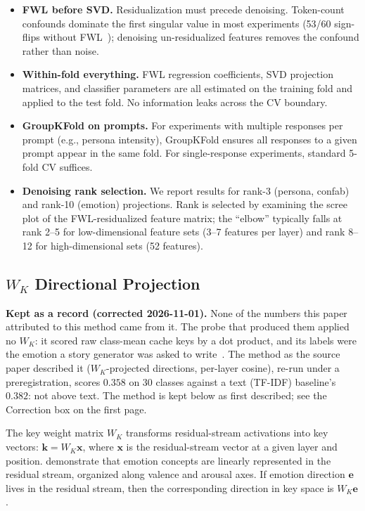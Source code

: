 \documentclass[11pt,a4paper]{article}
\begin{document}
\begin{itemize}[nosep]
    \item \textbf{FWL before SVD.} Residualization must precede denoising.
    Token-count confounds dominate the first singular value in most experiments
    (53/60 sign-flips without FWL~\citep{lyra_spectral}); denoising
    un-residualized features removes the confound rather than noise.

    \item \textbf{Within-fold everything.} FWL regression coefficients, SVD
    projection matrices, and classifier parameters are all estimated on the
    training fold and applied to the test fold. No information leaks across
    the CV boundary.

    \item \textbf{GroupKFold on prompts.} For experiments with multiple
    responses per prompt (e.g., persona intensity), GroupKFold ensures all
    responses to a given prompt appear in the same fold. For single-response
    experiments, standard 5-fold CV suffices.

    \item \textbf{Denoising rank selection.} We report results for rank-3
    (persona, confab) and rank-10 (emotion) projections. Rank is selected by
    examining the scree plot of the FWL-residualized feature matrix; the
    ``elbow'' typically falls at rank 2--5 for low-dimensional feature sets
    (3--7 features per layer) and rank 8--12 for high-dimensional sets (52
    features).
\end{itemize}

\subsection{$W_K$ Directional Projection}
\label{sec:wk}

\noindent\textbf{Kept as a record (corrected 2026-11-01).} None of the
numbers this paper attributed to this method came from it. The probe that
produced them applied no $W_K$: it scored raw class-mean cache keys by a dot
product, and its labels were the emotion a story generator was asked to
write~\citep{lyra_p4}. The method as the source paper described it
($W_K$-projected directions, per-layer cosine), re-run under a
preregistration, scores $0.358$ on 30 classes against a text (TF-IDF)
baseline's $0.382$: not above text. The method is kept below as first
described; see the Correction box on the first page.

The key weight matrix $W_K$ transforms residual-stream activations into key
vectors: $\mathbf{k} = W_K \mathbf{x}$, where $\mathbf{x}$ is the
residual-stream vector at a given layer and position.
\citet{anthropic2026emotions} demonstrate that emotion concepts are linearly
represented in the residual stream, organized along valence and arousal axes.
If emotion direction $\mathbf{e}$ lives in the residual stream, then the
corresponding direction in key space is $W_K \mathbf{e}$.
\end{document}
